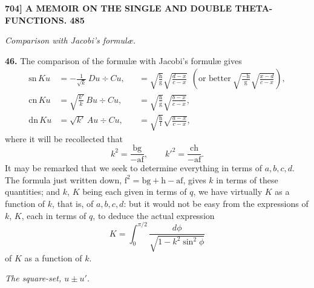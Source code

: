 \documentclass[11pt]{article}
\begin{document}
\bigskip
\noindent\textbf{704] \hfill A MEMOIR ON THE SINGLE AND DOUBLE THETA-FUNCTIONS. \hfill 485}

\medskip
\begin{center}\textit{Comparison with Jacobi's formul\ae.}\end{center}

\textbf{46.} The comparison of the formul\ae{} with Jacobi's formul\ae{} gives
\[
\begin{aligned}
\mathrm{sn}\,Ku &= -\frac{1}{\sqrt{k}}\,Du \div Cu, &&= \sqrt{\frac{\mathrm{h}}{\mathrm{g}}}\sqrt{\frac{d-x}{c-x}}\ \ (\text{or better}\ \sqrt{\frac{-\mathrm{h}}{\mathrm{g}}}\sqrt{\frac{x-d}{c-x}}),\\
\mathrm{cn}\,Ku &= \sqrt{\frac{k'}{k}}\,Bu \div Cu, &&= \sqrt{\frac{\mathrm{h}}{\mathrm{g}}}\sqrt{\frac{b-x}{c-x}},\\
\mathrm{dn}\,Ku &= \sqrt{k'}\,Au \div Cu, &&= \sqrt{\frac{\mathrm{h}}{\mathrm{f}}}\sqrt{\frac{a-x}{c-x}},
\end{aligned}
\]
where it will be recollected that
\[
k^2 = \frac{\mathrm{b}\mathrm{g}}{-\mathrm{a}\mathrm{f}},\qquad k'^2 = \frac{\mathrm{c}\mathrm{h}}{-\mathrm{a}\mathrm{f}}.
\]
It may be remarked that we seek to determine everything in terms of $a,b,c,d$. The formula just written down, $\mathrm{f}^2 = \mathrm{b}\mathrm{g} + \mathrm{h} - \mathrm{a}\mathrm{f}$, gives $k$ in terms of these quantities; and $k$, $K$ being each given in terms of $q$, we have virtually $K$ as a function of $k$, that is, of $a,b,c,d$: but it would not be easy from the expressions of $k$, $K$, each in terms of $q$, to deduce the actual expression
\[
K = \int_0^{\pi/2}\frac{d\phi}{\sqrt{1-k^2\sin^2\phi}}
\]
of $K$ as a function of $k$.

\medskip
\begin{center}\textit{The square-set, $u\pm u'$.}\end{center}
\end{document}
